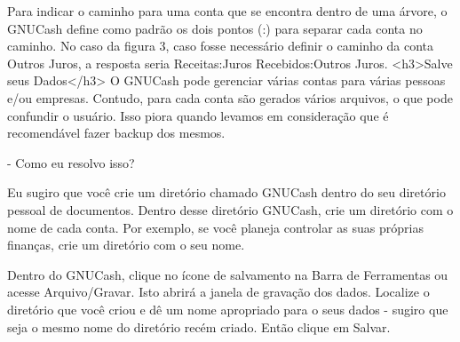 Para indicar o caminho para uma conta que se encontra dentro de uma árvore, o GNUCash define como padrão os dois pontos (:) para separar cada conta no caminho. No caso da figura 3, caso fosse necessário definir o caminho da conta Outros Juros, a resposta seria Receitas:Juros Recebidos:Outros Juros.
<h3>Salve seus Dados</h3>
O GNUCash pode gerenciar várias contas para várias pessoas e/ou empresas. Contudo, para cada conta são gerados vários arquivos, o que pode confundir o usuário. Isso piora quando levamos em consideração que é recomendável fazer backup dos mesmos.

- Como eu resolvo isso?

Eu sugiro que você crie um diretório chamado GNUCash dentro do seu diretório pessoal de documentos. Dentro desse diretório GNUCash, crie um diretório com o nome de cada conta. Por exemplo, se você planeja controlar as suas próprias finanças, crie um diretório com o seu nome.

Dentro do GNUCash, clique no ícone de salvamento na Barra de Ferramentas ou acesse Arquivo/Gravar. Isto abrirá a janela de gravação dos dados. Localize o diretório que você criou e dê um nome apropriado para o seus dados - sugiro que seja o mesmo nome do diretório recém criado. Então clique em Salvar.
